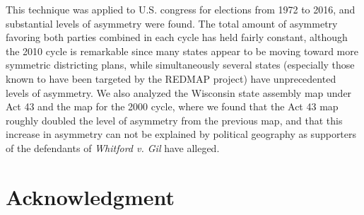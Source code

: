 \documentclass[preprint,12pt]{article}
\begin{document}
This technique was applied to U.S. congress for elections from 1972 to 2016, and substantial levels of asymmetry were found.
The total amount of asymmetry favoring both parties combined in each cycle has held fairly constant, although the 2010 cycle is remarkable since many states appear to be moving toward more symmetric districting plans, while simultaneously several states (especially those known to have been targeted by the REDMAP project) have unprecedented levels of asymmetry.
We also analyzed the Wisconsin state assembly map under Act 43 and the map for the 2000 cycle, where we found that the Act 43 map roughly doubled the level of asymmetry from the previous map, and that this increase in asymmetry can not be explained by political geography as supporters of the defendants of \emph{Whitford v. Gil} have alleged.


\clearpage
\section*{Acknowledgment}
\section*{}


\clearpage
\end{document}
